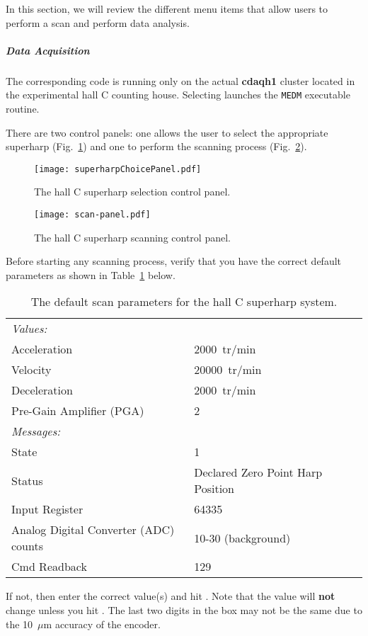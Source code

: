 In this section, we will review the different menu items that allow users to perform a scan and
perform data analysis.

	\subparagraph{Data Acquisition}\label{daq}

The corresponding code is running only on the actual {\bf cdaqh1} cluster located in the experimental
hall C counting house. Selecting {\bf{}} launches the {\tt MEDM} executable routine.

There are two control panels: one allows the user to select the appropriate superharp
(Fig.~\ref{figure:choose_harp}) and one to perform the scanning process (Fig.~\ref{figure:scan_harp}).

\begin{figure}[!hbt]
\begin{center}
\texttt{[image: superharpChoicePanel.pdf]}
\caption{The hall C superharp selection control panel.}\label{figure:choose_harp}
\end{center}
\end{figure}


\begin{figure}[!hbt]
\begin{center}
\texttt{[image: scan-panel.pdf]}
\caption{The hall C superharp scanning control panel.}\label{figure:scan_harp}
\end{center}
\end{figure}

Before starting any scanning process, verify that you have the correct default parameters as shown in
Table~\ref{table:scan_harp} below.
\begin{table}[!hbt]
\begin{center}
\begin{tabular}{llr}
\hline
\hline
{\it Values:}			&	\\ 
Acceleration			& 2000~tr/min	\\
Velocity			& 20000~tr/min	\\
Deceleration			& 2000~tr/min	\\
Pre-Gain Amplifier (PGA)	& 2	\\
\hline
\hline
{\it Messages:} 		&	\\
State				& 1	\\
Status				& Declared Zero Point Harp Position \\
Input Register			& 64335 \\
Analog Digital Converter (ADC) counts& 10-30 (background) \\
Cmd Readback			& 129	\\
\hline
\hline
\end{tabular}
	\caption{The default scan parameters for the hall C superharp system.}
	\label{table:scan_harp}
\end{center}
\end{table}
If not, then enter the correct value(s) and hit {\bf{}}. Note that the value will {\bf not}
change  unless you hit . The last two digits in the
{\bf{}} box may
not be the same due to the 10~$\mu$m accuracy of the encoder.


